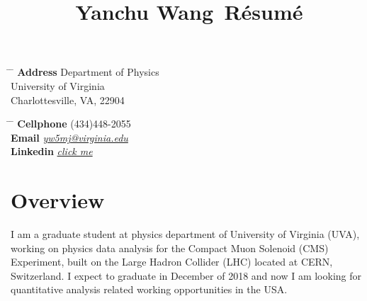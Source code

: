 \documentclass[10pt]{article} %
\begin{document}

\title{Yanchu Wang\, \small{Résumé}} %


\parbox{0.5\textwidth}{ %
\begin{tabbing} %
\hspace{3cm} \= \hspace{4cm} \= \kill %
{\bf Address} \> Department of Physics \\
\> University of Virginia\\ %
\> Charlottesville, VA, 22904 \\ %

\end{tabbing}}
\hfill %
\parbox{0.5\textwidth}{ %
\begin{tabbing} %
\hspace{3cm} \= \hspace{4cm} \= \kill %
{\bf Cellphone} \> (434)448-2055 \\ %
{\bf Email} \> \href{mailto:yw5mj@virginia.edu}{\textit{yw5mj@virginia.edu}} \\ %
{\bf Linkedin} \> \href{https://www.linkedin.com/in/yanchu-wang-46040289/}{\textit{click me}} \\ %
\end{tabbing}}


\section{Overview}

I am a graduate student at physics department of University of Virginia (UVA), working on physics data analysis for the Compact Muon Solenoid (CMS) Experiment, built on the Large Hadron Collider (LHC) located at CERN, Switzerland. I expect to graduate in December of 2018 and now I am looking for quantitative analysis related working opportunities in the USA.
\end{document}
